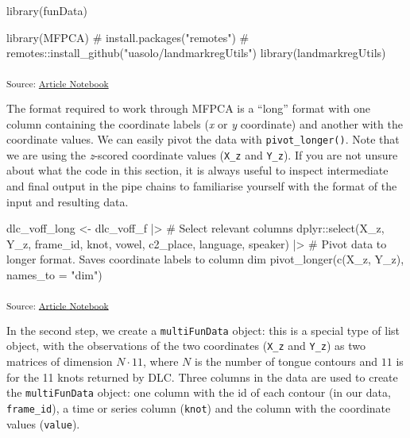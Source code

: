 \documentclass[
]{interact}
\newenvironment{Shaded}{\begin{snugshade}}{\end{snugshade}}
\newcommand{\AttributeTok}[1]{\textcolor[rgb]{0.40,0.45,0.13}{#1}}
\newcommand{\CommentTok}[1]{\textcolor[rgb]{0.37,0.37,0.37}{#1}}
\newcommand{\FunctionTok}[1]{\textcolor[rgb]{0.28,0.35,0.67}{#1}}
\newcommand{\NormalTok}[1]{\textcolor[rgb]{0.00,0.23,0.31}{#1}}
\newcommand{\OtherTok}[1]{\textcolor[rgb]{0.00,0.23,0.31}{#1}}
\newcommand{\SpecialCharTok}[1]{\textcolor[rgb]{0.37,0.37,0.37}{#1}}
\newcommand{\StringTok}[1]{\textcolor[rgb]{0.13,0.47,0.30}{#1}}
\begin{document}
\begin{Shaded}
\begin{Highlighting}[]
\FunctionTok{library}\NormalTok{(funData)}
\end{Highlighting}
\end{Shaded}

\begin{Shaded}
\begin{Highlighting}[]
\FunctionTok{library}\NormalTok{(MFPCA)}
\CommentTok{\# install.packages("remotes")}
\CommentTok{\# remotes::install\_github("uasolo/landmarkregUtils")}
\FunctionTok{library}\NormalTok{(landmarkregUtils)}
\end{Highlighting}
\end{Shaded}

\textsubscript{Source:
\href{https://stefanocoretta.github.io/mv_uti/index.qmd.html}{Article
Notebook}}

The format required to work through MFPCA is a ``long'' format with one
column containing the coordinate labels (\emph{x} or \emph{y}
coordinate) and another with the coordinate values. We can easily pivot
the data with \texttt{pivot\_longer()}. Note that we are using the
\emph{z}-scored coordinate values (\texttt{X\_z} and \texttt{Y\_z}). If
you are not unsure about what the code in this section, it is always
useful to inspect intermediate and final output in the pipe chains to
familiarise yourself with the format of the input and resulting data.

\begin{Shaded}
\begin{Highlighting}[]
\NormalTok{dlc\_voff\_long }\OtherTok{\textless{}{-}}\NormalTok{ dlc\_voff\_f }\SpecialCharTok{|\textgreater{}} 
  \CommentTok{\# Select relevant columns}
\NormalTok{  dplyr}\SpecialCharTok{::}\FunctionTok{select}\NormalTok{(X\_z, Y\_z, frame\_id, knot, vowel, c2\_place, language, speaker) }\SpecialCharTok{|\textgreater{}} 
  \CommentTok{\# Pivot data to longer format. Saves coordinate labels to column \textasciigrave{}dim\textasciigrave{}}
  \FunctionTok{pivot\_longer}\NormalTok{(}\FunctionTok{c}\NormalTok{(X\_z, Y\_z), }\AttributeTok{names\_to =} \StringTok{"dim"}\NormalTok{)}
\end{Highlighting}
\end{Shaded}

\textsubscript{Source:
\href{https://stefanocoretta.github.io/mv_uti/index.qmd.html}{Article
Notebook}}

In the second step, we create a \texttt{multiFunData} object: this is a
special type of list object, with the observations of the two
coordinates (\texttt{X\_z} and \texttt{Y\_z}) as two matrices of
dimension \(N \cdot 11\), where \(N\) is the number of tongue contours
and \(11\) is for the 11 knots returned by DLC. Three columns in the
data are used to create the \texttt{multiFunData} object: one column
with the id of each contour (in our data, \texttt{frame\_id}), a time or
series column (\texttt{knot}) and the column with the coordinate values
(\texttt{value}).
\end{document}
